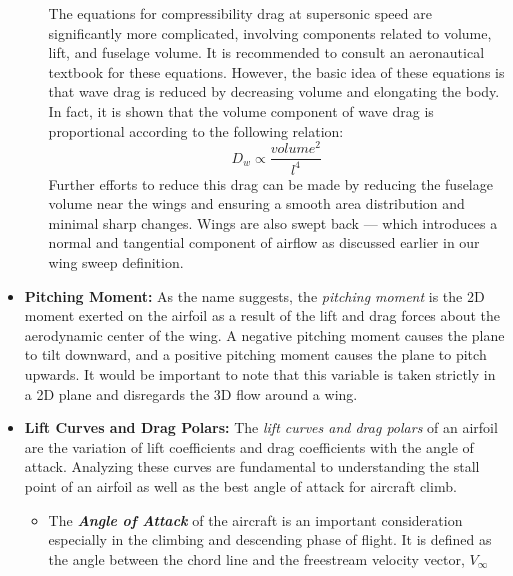 \documentclass{article}
\begin{document}
\begin{itemize}
\begin{itemize}
            The equations for compressibility drag at supersonic speed are significantly more complicated, involving components related to volume, lift, and fuselage volume. It is recommended to consult an aeronautical textbook 
            for these equations. However, the basic idea of these equations is that wave drag is reduced by decreasing volume and elongating the body. In fact, it is shown that the volume component of wave drag
            is proportional according to the following relation:
            \begin{equation}
            D_w \propto \frac{volume^2}{l^4}
            \end{equation}
            Further efforts to reduce this drag can be made by reducing the fuselage volume near the wings and ensuring a smooth area distribution and minimal sharp changes. Wings are also swept back --- 
            which introduces a normal and tangential component of airflow as discussed earlier in our wing sweep definition. 

        \end{itemize}
        


    \item[] \textbf{Pitching Moment:} As the name suggests, the \textit{pitching moment} is the 2D moment exerted on the airfoil as a result of the lift and drag forces about the aerodynamic center of the wing.
    A negative pitching moment causes the plane to tilt downward, and a positive pitching moment causes the plane to pitch upwards. It would be important to note that this variable is taken strictly in a 2D plane and
    disregards the 3D flow around a wing.
    
    \item[] \textbf{Lift Curves and Drag Polars:} The \textit{lift curves and drag polars} of an airfoil are the variation of lift coefficients and drag coefficients with the angle of attack. Analyzing these
    curves are fundamental to understanding the stall point of an airfoil as well as the best angle of attack for aircraft climb. 
    
        \begin{itemize}
            \item The \textbf{\textit{Angle of Attack}} of the aircraft is an important consideration especially in the climbing and descending phase of flight. It is defined as the angle between the chord line
            and the freestream velocity vector, $V_{\infty}$
            

\end{itemize}
\end{itemize}
\end{document}
